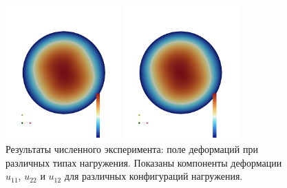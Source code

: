 






\begin{figure}[htbp]
\centering
\includegraphics[width=0.8\textwidth]{img/bx_inf_u.png}
\caption{Результаты численного эксперимента: поле деформаций при различных типах нагружения. Показаны компоненты деформации $u_{11}$, $u_{22}$ и $u_{12}$ для различных конфигураций нагружения.}
\label{fig:numerical_deformations}
\end{figure}


